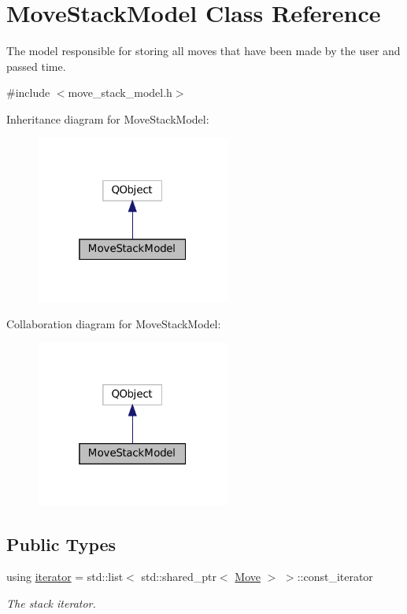 \hypertarget{class_move_stack_model}{}\section{Move\+Stack\+Model Class Reference}
\label{class_move_stack_model}


The model responsible for storing all moves that have been made by the user and passed time.  




{\ttfamily \#include $<$move\+\_\+stack\+\_\+model.\+h$>$}



Inheritance diagram for Move\+Stack\+Model\+:
\nopagebreak
\begin{figure}[H]
\begin{center}
\leavevmode
\includegraphics[width=181pt]{class_move_stack_model__inherit__graph}
\end{center}
\end{figure}


Collaboration diagram for Move\+Stack\+Model\+:
\nopagebreak
\begin{figure}[H]
\begin{center}
\leavevmode
\includegraphics[width=181pt]{class_move_stack_model__coll__graph}
\end{center}
\end{figure}
\subsection*{Public Types}
\begin{DoxyCompactItemize}
\item 
using \mbox{\hyperlink{class_move_stack_model_a64b3cd5b744e18ce4cebd87957b2f3fa}{iterator}} = std\+::list$<$ std\+::shared\+\_\+ptr$<$ \mbox{\hyperlink{struct_move}{Move}} $>$ $>$\+::const\+\_\+iterator
\begin{DoxyCompactList}\small\item\em The stack iterator. \end{DoxyCompactList}\end{DoxyCompactItemize}
